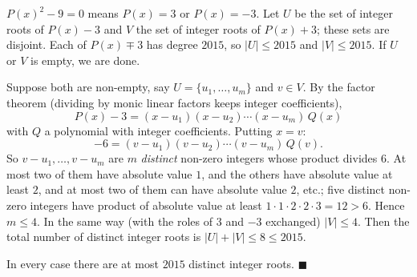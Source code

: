 $P(x)^2-9=0$ means $P(x)=3$ or $P(x)=-3$. Let $U$ be the set of integer roots of $P(x)-3$ and $V$ the set of integer roots of $P(x)+3$; these sets are disjoint. Each of $P(x)\mp3$ has degree $2015$, so $|U|\le2015$ and $|V|\le2015$. If $U$ or $V$ is empty, we are done.

Suppose both are non-empty, say $U=\{u_1,\dots,u_m\}$ and $v\in V$. By the factor theorem (dividing by monic linear factors keeps integer coefficients),
\[
P(x)-3=(x-u_1)(x-u_2)\cdots(x-u_m)\,Q(x)
\]
with $Q$ a polynomial with integer coefficients. Putting $x=v$:
\[
-6=(v-u_1)(v-u_2)\cdots(v-u_m)\,Q(v).
\]
So $v-u_1,\dots,v-u_m$ are $m$ \emph{distinct} non-zero integers whose product divides $6$. At most two of them have absolute value $1$, and the others have absolute value at least $2$, and at most two of them can have absolute value $2$, etc.; five distinct non-zero integers have product of absolute value at least $1\cdot1\cdot2\cdot2\cdot3=12>6$. Hence $m\le4$. In the same way (with the roles of $3$ and $-3$ exchanged) $|V|\le4$. Then the total number of distinct integer roots is $|U|+|V|\le8\le2015$.

In every case there are at most $2015$ distinct integer roots. $\blacksquare$
